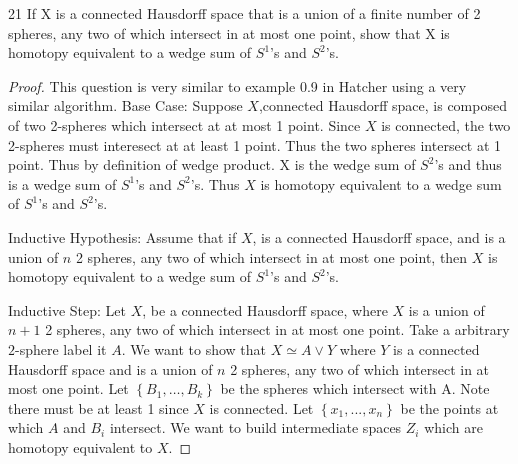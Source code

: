 \documentclass{article}
\begin{document}
\begin{claim}{21}\label{Claim 21.}
    If X is a connected Hausdorﬀ space that is a union of a finite number of 2 spheres, any two of which intersect in at most one point, show that X is homotopy equivalent to a wedge sum of $S^1$'s  and $S^2$’s.
\end{claim}
\begin{proof}
    This question is very similar to example 0.9 in Hatcher using a very similar algorithm. 
    Base Case: Suppose $X$,connected Hausdorﬀ space, is composed of two 2-spheres which intersect at at most 1 point. Since $X$ is connected, the two 2-spheres must interesect at at least 1 point. Thus the two spheres intersect at 1 point. Thus by definition of wedge product. X is the wedge sum of $S^2$'s and thus is a wedge sum of $S^1$'s and $S^2$'s. Thus $X$ is homotopy equivalent to a wedge sum of $S^1$'s and $S^2$’s. 
    
    Inductive Hypothesis: Assume that if $X$, is a connected Hausdorﬀ space, and is a union of $n$ 2 spheres, any two of which intersect in at most one point, then $X$ is homotopy equivalent to a wedge sum of $S^1$'s  and $S^2$’s.

    Inductive Step: Let $X$, be a connected Hausdorﬀ space, where $X$ is a union of $n + 1$ 2 spheres, any two of which intersect in at most one point. Take a arbitrary $2$-sphere label it $A$. We want to show that $X \simeq A \vee Y$ where $Y$ is a connected Hausdorﬀ space and is a union of $n$ 2 spheres, any two of which intersect in at most one point. Let $\left\{ B_1, \dots, B_k \right\}$ be the spheres which intersect with A. Note there must be at least 1 since $X$ is connected. Let $\left\{ x_1, ..., x_n \right\}$ be the points at which $A$ and $B_i$ intersect. We want to build intermediate spaces $Z_i$ which are homotopy equivalent to $X$. 
    

\end{proof}
\end{document}
